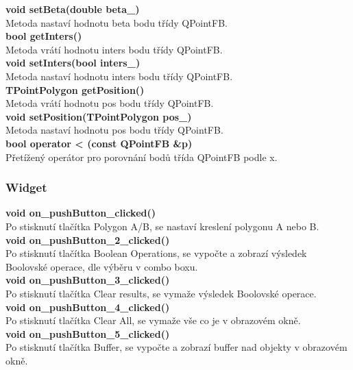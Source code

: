 \documentclass[a4paper, 12pt]{article}
\begin{document}
\textbf{void setBeta(double beta_)}\\
Metoda nastaví hodnotu beta bodu třídy QPointFB.\\

\textbf{bool getInters()}\\
Metoda vrátí hodnotu inters bodu třídy QPointFB.\\

\textbf{void setInters(bool inters_)}\\
Metoda nastaví hodnotu inters bodu třídy QPointFB.\\

\textbf{TPointPolygon getPosition()}\\
Metoda vrátí hodnotu pos bodu třídy QPointFB.\\

\textbf{void setPosition(TPointPolygon pos_)}\\
Metoda nastaví hodnotu pos bodu třídy QPointFB.\\

\textbf{bool operator < (const QPointFB &p)}\\
Přetížený operátor pro porovnání bodů třída QPointFB podle x.\\

\subsubsection{Widget}

\textbf{void on_pushButton_clicked()}\\
Po stisknutí tlačítka Polygon A/B, se nastaví kreslení polygonu A nebo B.\\

\textbf{void on_pushButton_2_clicked()}\\
Po stisknutí tlačítka Boolean Operations, se vypočte a zobrazí výsledek Boolovské operace, dle výběru v combo boxu.\\

\textbf{void on_pushButton_3_clicked()}\\
Po stisknutí tlačítka Clear results, se vymaže výsledek Boolovské operace.\\

\textbf{void on_pushButton_4_clicked()}\\
Po stisknutí tlačítka Clear All, se vymaže vše co je v obrazovém okně.\\

\textbf{void on_pushButton_5_clicked()}\\
Po stisknutí tlačítka Buffer, se vypočte a zobrazí buffer nad objekty v obrazovém okně.\\
\end{document}
